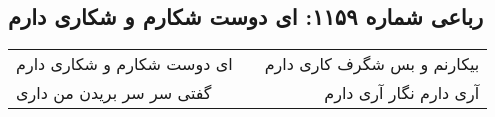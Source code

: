 \begin{center}
\section*{رباعی شماره ۱۱۵۹: ای دوست شکارم و شکاری دارم}
\label{sec:1159}
\begin{longtable}{l p{0.5cm} r}
ای دوست شکارم و شکاری دارم
&&
بیکارنم و بس شگرف کاری دارم
\\
گفتی سر سر بریدن من داری
&&
آری دارم نگار آری دارم
\\
\end{longtable}
\end{center}
